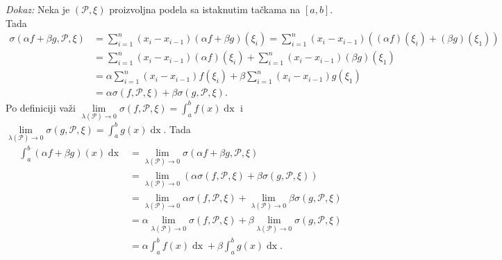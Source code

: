 \documentclass{article}
\DeclareMathOperator{\dx}{dx}
\begin{document}
\textit{Dokaz:} Neka je $\left(\mathcal{P}, \xi\right)$ proizvoljna podela sa istaknutim tačkama na $\left[a, b\right]$. Tada
\begin{align*}
    \sigma\left(\alpha f+\beta g, \mathcal{P}, \xi\right) & = \sum^n_{i=1} \left(x_i - x_{i-1}\right)\left(\alpha f+\beta g\right)\left(\xi_i\right)                           = \sum^n_{i=1} \left(x_i - x_{i-1}\right)\left(\left(\alpha f\right)\left(\xi_i\right) + \left(\beta g\right)\left(\xi_1\right)\right) \\
                                                          & = \sum^n_{i=1} \left(x_i - x_{i-1}\right)\left(\alpha f\right)\left(\xi_i\right) + \sum^n_{i=1} \left(x_i - x_{i-1}\right)\left(\beta g\right)\left(\xi_1\right)                                                                                          \\
                                                          & = \alpha\sum^n_{i=1} \left(x_i - x_{i-1}\right) f\left(\xi_i\right) + \beta\sum^n_{i=1} \left(x_i - x_{i-1}\right)g\left(\xi_1\right)                                                                                                                     \\
                                                          & = \alpha\sigma\left(f, \mathcal{P}, \xi\right) + \beta\sigma\left(g, \mathcal{P}, \xi\right).
\end{align*}
Po definiciji važi $\displaystyle\lim\limits_{\lambda\left(\mathcal{P}\right)\longrightarrow0} \sigma\left(f, \mathcal{P}, \xi\right) = \int^b_a f\left(x\right)\dx$ i $\displaystyle \lim\limits_{\lambda\left(\mathcal{P}\right)\longrightarrow0} \sigma\left(g, \mathcal{P}, \xi\right) = \int^b_a g\left(x\right)\dx$. Tada
\begin{align*}
    \int_{a}^{b}\left(\alpha f+\beta g\right)\left(x\right)\dx & =\lim\limits_{\lambda\left(\mathcal{P}\right)\longrightarrow0} \sigma\left(\alpha f+\beta g, \mathcal{P}, \xi\right)                                                                                                  \\
                                                               & =\lim\limits_{\lambda\left(\mathcal{P}\right)\longrightarrow0}\left(\alpha\sigma\left(f, \mathcal{P}, \xi\right) + \beta\sigma\left(g, \mathcal{P}, \xi\right)\right)                                                 \\
                                                               & =\lim\limits_{\lambda\left(\mathcal{P}\right)\longrightarrow0}\alpha\sigma\left(f, \mathcal{P}, \xi\right) + \lim\limits_{\lambda\left(\mathcal{P}\right)\longrightarrow0}\beta\sigma\left(g, \mathcal{P}, \xi\right) \\
                                                               & =\alpha\lim\limits_{\lambda\left(\mathcal{P}\right)\longrightarrow0}\sigma\left(f, \mathcal{P}, \xi\right) + \beta\lim\limits_{\lambda\left(\mathcal{P}\right)\longrightarrow0}\sigma\left(g, \mathcal{P}, \xi\right) \\
                                                               & =\alpha \int^b_a f\left(x\right)\dx +\beta\int^b_a g\left(x\right)\dx.
\end{align*}
\end{document}
